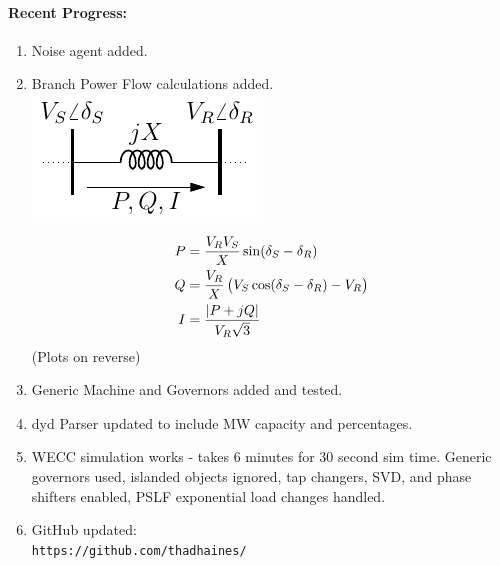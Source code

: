 \documentclass[12pt]{article}
\begin{document}
\begin{multicols}{2}
\raggedright
	\paragraph{Recent Progress:}
	\begin{enumerate}
\itemsep0em 
		\item Noise agent added.
		\item Branch Power Flow calculations added. \\
\includegraphics[width=.75\linewidth]{../../models/2bus/2bus}
\begin{align}
P &= \dfrac{V_R V_S}{X} \sin(\delta_S - \delta_R)\\
Q &= \dfrac{V_R}{X} \left(V_S\cos(\delta_S - \delta_R)-V_R\right)\\
I &= \dfrac{\abs{P + jQ}}{V_R\sqrt{3}}
\end{align}
(Plots on reverse)
		\item Generic Machine and Governors added and tested.
		\item dyd Parser updated to include MW capacity and percentages.
		\item WECC simulation works - takes 6 minutes for 30 second sim time. Generic governors used, islanded objects ignored, tap changers, SVD, and phase shifters enabled, PSLF exponential load changes handled.

		\item GitHub updated:\\
		\verb|https://github.com/thadhaines/|
		
	\end{enumerate}

\end{multicols}
\end{document}
